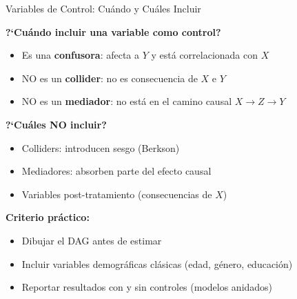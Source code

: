 \documentclass[aspectratio=169,11pt]{beamer}
\begin{document}
\begin{frame}{Variables de Control: Cu\'ando y Cu\'ales Incluir}

\small
\textbf{?`Cu\'ando incluir una variable como control?}
\begin{itemize}
    \setlength{\itemsep}{2pt}
    \item Es una \textbf{confusora}: afecta a $Y$ y est\'a correlacionada con $X$
    \item NO es un \textbf{collider}: no es consecuencia de $X$ e $Y$
    \item NO es un \textbf{mediador}: no est\'a en el camino causal $X \rightarrow Z \rightarrow Y$
\end{itemize}

\vspace{0.3cm}

\textbf{?`Cu\'ales NO incluir?}
\begin{itemize}
    \setlength{\itemsep}{2pt}
    \item Colliders: introducen sesgo (Berkson)
    \item Mediadores: absorben parte del efecto causal
    \item Variables post-tratamiento (consecuencias de $X$)
\end{itemize}

\vspace{0.3cm}

\textbf{Criterio pr\'actico:}
\begin{itemize}
    \setlength{\itemsep}{2pt}
    \item Dibujar el DAG antes de estimar
    \item Incluir variables demogr\'aficas cl\'asicas (edad, g\'enero, educaci\'on)
    \item Reportar resultados con y sin controles (modelos anidados)
\end{itemize}

\end{frame}
\end{document}
